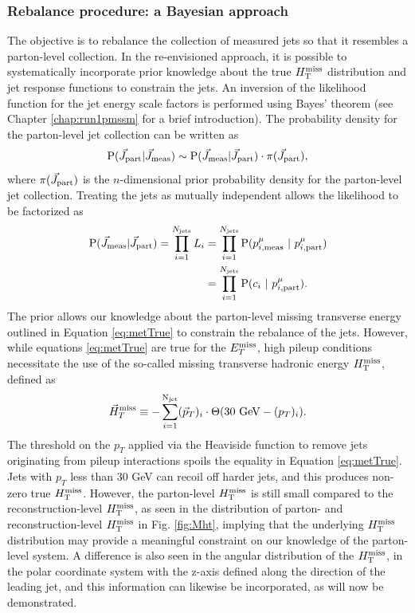 \subsubsection{Rebalance procedure: a Bayesian approach}
The objective is to rebalance the collection of measured jets so that it resembles a parton-level collection. In the re-envisioned approach,  it is possible to systematically  incorporate prior knowledge about the true $H_{\text{T}}^{\rm miss}$ distribution and jet response functions to constrain the jets.  An inversion of the likelihood function for the jet energy scale factors is performed using Bayes' theorem (see Chapter \ref{chap:run1pmssm} for a brief introduction). The probability density for the parton-level jet collection can be written as
\begin{equation}
{\rm P}(\vec{J}_{\rm part}|\vec{J}_{\rm meas}) \sim {\rm P}(\vec{J}_{\rm meas}|\vec{J}_{\rm part})\cdot \pi(\vec{J}_{\rm part}),
\label{eq:posterior1}
\end{equation}
where $\pi(\vec{J}_{\rm part})$ is the $n$-dimensional prior probability density for the parton-level jet collection.
Treating the jets as mutually independent allows the likelihood to be factorized as
\begin{align}
\begin{split}
{\rm P}(\vec{J}_{\rm meas}|\vec{J}_{\rm part}) = \prod_{i=1}^{N_{\rm jets}}L_{i} &= \prod_{i=1}^{N_{\rm jets}}{\rm P}(p^{\mu}_{i,\rm meas}\ |\ p^{\mu}_{i,\rm part})\\
&=\prod_{i=1}^{N_{\rm jets}}{\rm P}(c_i\ |\ p^{\mu}_{i,\rm part}).
\end{split}
\label{eq:likelihood1}
\end{align}
The prior allows our knowledge about the parton-level missing transverse energy outlined in Equation \ref{eq:metTrue} to constrain the rebalance of the jets. However, while equations \ref{eq:metTrue} are true for the $E_{T}^{\rm miss}$, high pileup conditions necessitate the use of the so-called missing transverse hadronic energy $H_{\text{T}}^{\rm miss}$, defined as
\begin{equation}
\vec{H}_{T}^{\rm miss} \equiv -\sum_{i=1}^{{\rm N}_{\rm jet}}(\vec{p}_{T})_{i}\cdot\Theta(30{\rm\ GeV}-(p_{T})_{i}).
\end{equation}
The threshold on the $p_{T}$ applied via the Heaviside function to remove jets originating from pileup interactions spoils the equality in Equation \ref{eq:metTrue}. Jets with $p_{T}$ less than 30 GeV can recoil off harder jets, and this produces non-zero true $H_{\text{T}}^{\rm miss}$. However, the parton-level $H_{\text{T}}^{\rm miss}$ is still small compared to the reconstruction-level $H_{\text{T}}^{\rm miss}$, as seen in the distribution of parton- and reconstruction-level $H_{\text{T}}^{\rm miss}$ in Fig. \ref{fig:Mht}, implying that the underlying $H_{\text{T}}^{\rm miss}$ distribution may provide a meaningful constraint on our knowledge of the parton-level system. A difference is also seen in the angular distribution of the $H_{\text{T}}^{\rm miss}$, in the polar coordinate system with the z-axis defined along the direction of the leading jet, and this information can likewise be incorporated, as will now be demonstrated.
